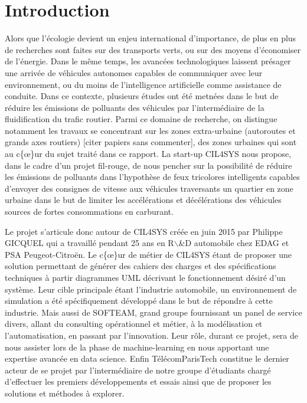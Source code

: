 \documentclass[11pt]{article}
\author{Thomas}
\date{\today}
\title{}
\begin{document}
\tableofcontents


\section{Introduction}
\label{sec:org05a3642}

Alors que l'écologie devient un enjeu international d'importance, de plus en plus de recherches sont faites sur des transports verts, ou sur des moyens d'économiser de l'énergie. Dans le même temps, les avancées technologiques laissent présager une arrivée de véhicules autonomes capables de communiquer avec leur environnement, ou du moins de l'intelligence artificielle comme assistance de conduite. Dans ce contexte, plusieurs études ont été metnées dans le but de réduire les émissions de polluants des véhicules par l'intermédiaire de la fluidification du trafic routier. Parmi ce domaine de recherche, on distingue notamment les travaux se concentrant sur les zones extra-urbaine (autoroutes et grands axes routiers) [citer papiers sans commenter], des zones urbaines qui sont au c\{\oe\}ur du sujet traité dans ce rapport. La start-up CIL4SYS nous propose, dans le cadre d'un projet fil-rouge, de nous pencher sur la possibilité de réduire les émissions de polluants dans l'hypothèse de feux tricolores intelligents capables d'envoyer des consignes de vitesse aux véhicules traversants un quartier en zone urbaine dans le but de limiter les accélérations et décélérations des véhicules sources de fortes consommations en carburant.

Le projet s'articule donc autour de CIL4SYS créée en juin 2015 par Philippe GICQUEL qui a travaillé pendant 25 ans en R$\backslash$&D automobile chez EDAG et PSA Peugeot-Citroën. Le c\{\oe\}ur de métier de CIL4SYS étant de proposer une solution permettant de générer des cahiers des charges et des spécifications techniques à partir diagrammes UML décrivant le fonctionnement désiré d'un système. Leur cible principale étant l'industrie automobile, un environnement de simulation a été spécifiquement développé dans le but de répondre à cette industrie. Mais aussi de SOFTEAM, grand groupe fournissant un panel de service divers, allant du consulting opérationnel et métier, à la modélisation et l'automatisation, en passant par l'innovation. Leur rôle, durant ce projet, sera de nous assister lors de la phase de machine-learning en nous apportant une expertise avancée en data science. Enfin TélécomParisTech constitue le dernier acteur de se projet par l'intermédiaire de notre groupe d'étudiants chargé d'effectuer les premiers développements et essais ainsi que de proposer les solutions et méthodes à explorer.
\end{document}
